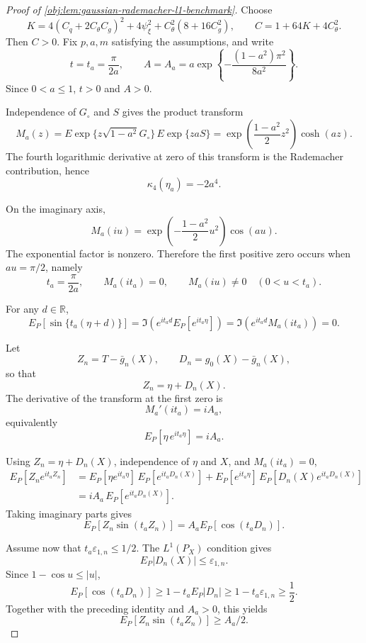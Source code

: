 \begin{proof}[Proof of \cref{obj:lem:gaussian-rademacher-l1-benchmark}]
Choose
\[
K=
4(C_q+2C_{\theta}C_g)^2+4\psi_\xi^2
+
C_{\theta}^2(8+16C_g^2),
\qquad
C=1+64K+4C_{\theta}^2 .
\]
Then \(C>0\).  Fix \(p,a,m\) satisfying the assumptions, and write
\[
t=t_a=\frac{\pi}{2a},
\qquad
A=A_a=a\exp\!\left\{-\frac{(1-a^2)\pi^2}{8a^2}\right\}.
\]
Since \(0<a\le1\), \(t>0\) and \(A>0\). %

Independence of \(G_\circ\) and \(S\) gives the product transform
\[
M_a(z)
=
E\exp\{z\sqrt{1-a^2}G_\circ\}\,
E\exp\{zaS\}
=
\exp\!\left(\frac{1-a^2}{2}z^2\right)\cosh(az).
\]
The fourth logarithmic derivative at zero of this transform is the Rademacher contribution, hence
\[
\kappa_4(\eta_a)=-2a^4 .
\]

On the imaginary axis,
\[
M_a(iu)=
\exp\!\left(-\frac{1-a^2}{2}u^2\right)\cos(au).
\]
The exponential factor is nonzero.  Therefore the first positive zero occurs when \(au=\pi/2\), namely
\[
t_a=\frac{\pi}{2a},
\qquad
M_a(it_a)=0,
\qquad
M_a(iu)\ne0\quad(0<u<t_a).
\]

For any \(d\in\mathbb R\),
\[
E_P[\sin\{t_a(\eta+d)\}]
=
\Im\left(e^{it_ad}E_P[e^{it_a\eta}]\right)
=
\Im\left(e^{it_ad}M_a(it_a)\right)
=
0 .
\]

Let
\[
Z_n=T-\bar g_n(X),
\qquad
D_n=g_0(X)-\bar g_n(X),
\]
so that
\[
Z_n=\eta+D_n(X).
\]
The derivative of the transform at the first zero is
\[
M_a'(it_a)
=
iA_a,
\]
equivalently
\[
E_P\!\left[\eta\,e^{it_a\eta}\right]=iA_a .
\]

Using \(Z_n=\eta+D_n(X)\), independence of \(\eta\) and \(X\), and \(M_a(it_a)=0\),
\[
\begin{aligned}
E_P[Z_ne^{it_aZ_n}]
&=
E_P[\eta e^{it_a\eta}]\,E_P[e^{it_aD_n(X)}]
+
E_P[e^{it_a\eta}]\,E_P[D_n(X)e^{it_aD_n(X)}]  \\
&=
iA_a\,E_P[e^{it_aD_n(X)}].
\end{aligned}
\]
Taking imaginary parts gives
\[
E_P[Z_n\sin(t_aZ_n)]
=
A_aE_P[\cos(t_aD_n)] .
\]

Assume now that \(t_a\varepsilon_{1,n}\le1/2\).  The \(L^1(P_X)\) condition gives
\[
E_P|D_n(X)|\le\varepsilon_{1,n}.
\]
Since \(1-\cos u\le |u|\),
\[
E_P[\cos(t_aD_n)]
\ge
1-t_aE_P|D_n|
\ge
1-t_a\varepsilon_{1,n}
\ge
\frac12 .
\]
Together with the preceding identity and \(A_a>0\), this yields
\[
E_P[Z_n\sin(t_aZ_n)]\ge A_a/2 .
\]


\end{proof}
